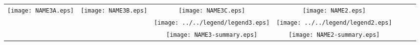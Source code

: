 \documentclass{minimal}
\begin{document}
\begin{tabular}[t]{ccccccc}
	\multirow{3}{*}{ \begin{minipage}[t][][b]{0.250\textwidth} {\centering \texttt{[image: NAME3A.eps]}} \end{minipage} } & 
	\multirow{3}{*}{ \begin{minipage}[t][][b]{0.245\textwidth} {\centering \texttt{[image: NAME3B.eps]}} \end{minipage} } & 
	\begin{minipage}[t][][b]{0.250\textwidth} {\centering \texttt{[image: NAME3C.eps]}} \vfill \end{minipage} & 
	\begin{minipage}[t][][b]{0.250\textwidth} {\centering \texttt{[image: NAME2.eps]}} \vfill \end{minipage} \\

 && \begin{minipage}[t][][t]{0.100\textwidth} {\centering \texttt{[image: ../../legend/legend3.eps]}} \end{minipage} & 
    \begin{minipage}[t][][t]{0.085\textwidth} {\centering \texttt{[image: ../../legend/legend2.eps]}} \end{minipage}\\

 && \begin{minipage}[t][][t]{0.090\textwidth} {\centering \texttt{[image: NAME3-summary.eps]}} \end{minipage} & 
    \begin{minipage}[t][][t]{0.090\textwidth} {\centering \texttt{[image: NAME2-summary.eps]}} \end{minipage}

\end{tabular}
\end{document}
